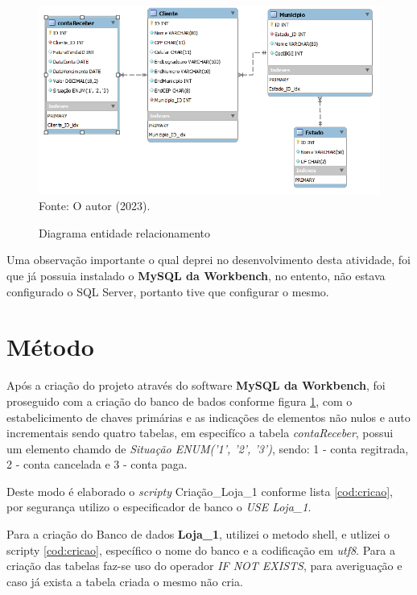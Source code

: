\begin{figure}[h!]
  \caption{Diagrama entidade relacionamento}
  \includegraphics[width=\textwidth]{figure/diagram_EER.png}
  \label{fig:DER}
  {\fontsize{10pt}{\baselineskip}\selectfont
  Fonte: O autor (2023).}
\end{figure}

\par Uma observação importante o qual deprei no desenvolvimento desta atividade, foi que já possuia instalado o \textbf{MySQL da Workbench}, no entento, não estava configurado o SQL Server, portanto tive que configurar o mesmo.


\section{Método}
\par Após a criação do projeto através do software \textbf{MySQL da Workbench}, foi proseguido com a criação do banco de bados conforme figura \ref{fig:DER}, com o estabelicimento de chaves primárias e as indicações de elementos não nulos e auto incrementais sendo quatro tabelas, em especifíco a tabela \textit{contaReceber}, possui um elemento chamdo de \textit{Situação ENUM('1', '2', '3')}, sendo: 1 - conta regitrada, 2 - conta cancelada e 3 - conta paga.


\par Deste modo é elaborado o \textit{scripty} Criação\_Loja\_1 conforme lista \ref{cod:cricao}, por segurança utilizo o especificador de banco o \textit{USE Loja\_1}.
\par Para a criação do Banco de dados \textbf{Loja\_1}, utilizei o metodo shell, e utlizei o scripty \autoref{cod:cricao}, específico o nome do banco e a codificação em \textit{utf8}. Para a criação das tabelas faz-se uso do operador \textit{IF NOT EXISTS}, para averiguação e caso já exista a tabela criada o mesmo não cria.

